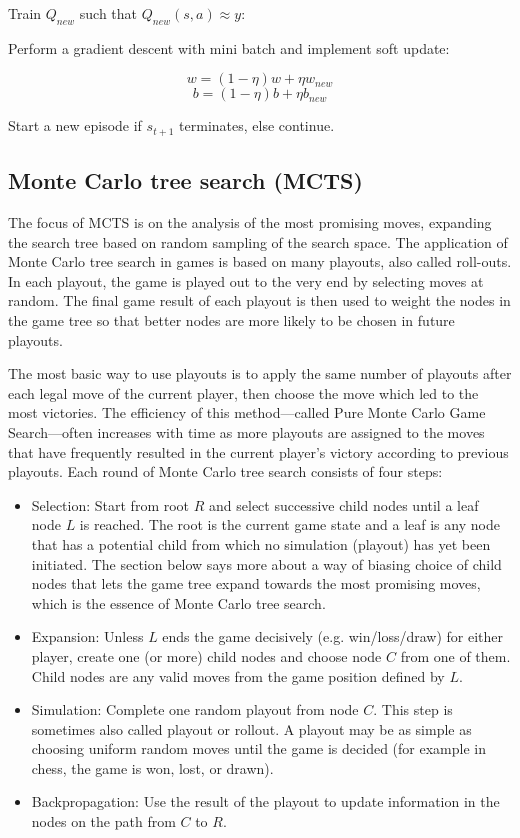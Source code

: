 \documentclass{article}
\begin{document}
\noindent \hspace{1cm} Train \(Q_{new}\) such that \(Q_{new}(s, a) \approx y\):

\noindent \hspace{1cm} Perform a gradient descent with mini batch and implement soft update:

\[w = (1 - \eta)w + \eta w_{new}\]
\[b = (1 - \eta)b + \eta b_{new}\]

\bigskip

\noindent \hspace{1cm} Start a new episode if \(s_{t+1}\) terminates, else continue.

\subsection{Monte Carlo tree search (MCTS)}

\noindent The focus of MCTS is on the analysis of the most promising moves, expanding the search tree based on random sampling of the search space. The application of Monte Carlo tree search in games is based on many playouts, also called roll-outs. In each playout, the game is played out to the very end by selecting moves at random. The final game result of each playout is then used to weight the nodes in the game tree so that better nodes are more likely to be chosen in future playouts.

\bigskip

\noindent The most basic way to use playouts is to apply the same number of playouts after each legal move of the current player, then choose the move which led to the most victories. The efficiency of this method—called Pure Monte Carlo Game Search—often increases with time as more playouts are assigned to the moves that have frequently resulted in the current player's victory according to previous playouts. Each round of Monte Carlo tree search consists of four steps:

\begin{itemize}
    \item Selection: Start from root \(R\) and select successive child nodes until a leaf node \(L\) is reached. The root is the current game state and a leaf is any node that has a potential child from which no simulation (playout) has yet been initiated. The section below says more about a way of biasing choice of child nodes that lets the game tree expand towards the most promising moves, which is the essence of Monte Carlo tree search.
    \item Expansion: Unless \(L\) ends the game decisively (e.g. win/loss/draw) for either player, create one (or more) child nodes and choose node \(C\) from one of them. Child nodes are any valid moves from the game position defined by \(L\).
    \item Simulation: Complete one random playout from node \(C\). This step is sometimes also called playout or rollout. A playout may be as simple as choosing uniform random moves until the game is decided (for example in chess, the game is won, lost, or drawn).
    \item Backpropagation: Use the result of the playout to update information in the nodes on the path from \(C\) to \(R\).
\end{itemize}
\end{document}
